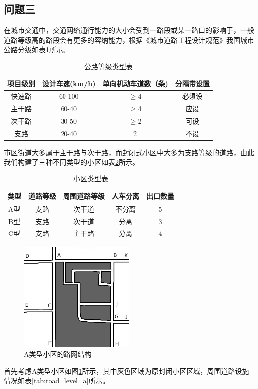 \documentclass[fontset=windows,a4paper,12pt]{ctexart}
\begin{document}
	\subsection{问题三}
		在城市交通中，交通网络通行能力的大小会受到一路段或某一路口的影响于，一般道路等级高的路段会有更多的容纳能力，根据《城市道路工程设计规范》我国城市公路分级如表\ref{tab:road_type}所示。
		\begin{table}[!htbp]
			\centering
			\caption{公路等级类型表}
			\label{tab:road_type}
			\begin{tabular}{c|ccc}
				\toprule[1pt]
				项目级别&设计车速(km/h)&单向机动车道数（条)&分隔带设置\\
				\hline
				快速路	&60-100	&$\geq$4	&必须设\\
				主干路	&60-40	&$\geq$4	&应设\\
				次干路	&30-50	&$\geq$2	&可设\\
				支路	 &20-40	 &2			&不设\\
				\bottomrule[1pt]
			\end{tabular}
		\end{table}
		
		市区街道大多属于主干路与次干路，而封闭式小区中大多为支路等级的道路，由此我们构建了三种不同类型的小区如表\ref{tab:apartment_type}所示。
		\begin{table}[!htbp]
			\centering
			\caption{小区类型表}
			\label{tab:apartment_type}
			\begin{tabular}{c|cccc}
				\toprule[1pt] 
				类型 & 道路等级 & 周围道路等级 & 人车分离 & 出口数量 \\ 
				\hline 
				A型 & 支路 & 次干道 & 不分离 &  5\\ 
				B型 & 支路 & 次干道 &  分离&  3\\ 
				C型 & 支路 & 主干路 &  分离&  4\\ 
				\bottomrule[1pt]
				\end{tabular} 
		\end{table}
		\begin{figure}[!htbp]
			\centering
			\includegraphics[width=0.5\textwidth]{pic/net_a.jpg}
			\caption{A类型小区的路网结构}
			\label{fig:net_a}
		\end{figure}		
		首先考虑A类型小区如图\ref{fig:net_a}所示，其中灰色区域为原封闭小区区域，周围道路设施情况如表\ref{tab:road_level_a}所示。
\end{document}
